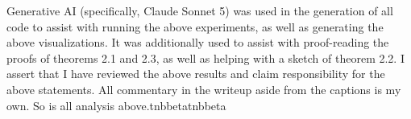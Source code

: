 Generative AI (specifically, Claude Sonnet 5) was used in the generation of all code to assist
with running the above experiments, as well as generating the above visualizations. It was
additionally used to assist with proof-reading the proofs of theorems 2.1 and 2.3, as well as
helping with a sketch of theorem 2.2. I assert that I have reviewed the above results and claim
responsibility for the above statements. All commentary in the writeup aside from the captions
is my own. So is all analysis above.tnbbetatnbbeta
